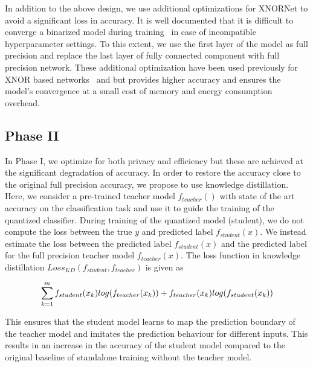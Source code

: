 In addition to the above design, we use additional optimizations for XNORNet to avoid a significant loss in accuracy.
It is well documented that it is difficult to converge a binarized model during training~\cite{AAAI1714619} in case of incompatible hyperparameter settings.
To this extent, we use the first layer of the model as full precision and replace the last layer of fully connected component with full precision network.
These additional optimization have been used previously for XNOR based networks~\cite{8114708,rastegari2016xnornet} and but provides higher accuracy and ensures the model's convergence at a small cost of memory and energy consumption overhead.



\subsection{Phase II}
\label{p2}

In Phase I, we optimize for both privacy and efficiency but these are achieved at the significant degradation of accuracy.
In order to restore the accuracy close to the original full precision accuracy, we propose to use knowledge distillation.
Here, we consider a pre-trained teacher model $f_{teacher}()$ with state of the art accuracy on the classification task and use it to guide the training of the quantized classifier.
During training of the quantized model (student), we do not compute the loss between the true $y$ and predicted label $f_{student}(x)$.
We instead estimate the loss between the predicted label $f_{student}(x)$ and the predicted label for the full precision teacher model $f_{teacher}(x)$.
The loss function in knowledge distillation $Loss_{KD} (f_{student}, f_{teacher})$ is given as

\begin{equation}
\footnotesize
\sum_{k=1}^m f_{student}(x_k)log(f_{teacher}(x_k)) + f_{teacher}(x_k)log(f_{student}(x_k))
\end{equation}

%
This ensures that the student model learns to map the prediction boundary of the teacher model and imitates the prediction behaviour for different inputs.
This results in an increase in the accuracy of the student model compared to the original baseline of standalone training without the teacher model.
